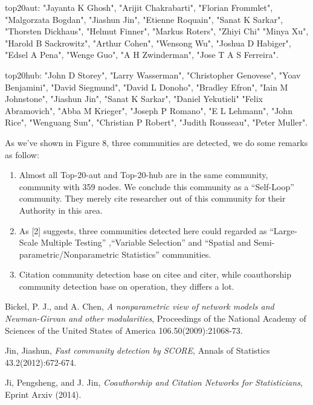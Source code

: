 \documentclass{article}
\numberwithin{equation}{section}
\begin{document}
top20aut: "Jayanta K Ghosh", "Arijit Chakrabarti", "Florian Frommlet", "Malgorzata Bogdan", "Jiashun Jin", "Etienne Roquain", "Sanat K Sarkar", "Thorsten Dickhaus", "Helmut Finner", "Markus Roters", "Zhiyi Chi"
"Minya Xu", "Harold B Sackrowitz", "Arthur Cohen", "Wensong Wu", "Joshua D Habiger", "Edsel A Pena", "Wenge Guo", "A H Zwinderman", "Jose T A S Ferreira".

top20hub: "John D Storey", "Larry Wasserman", "Christopher Genovese", "Yoav Benjamini", "David Siegmund", "David L Donoho", "Bradley Efron", "Iain M Johnstone", "Jiashun Jin", "Sanat K Sarkar", "Daniel Yekutieli"
"Felix Abramovich", "Abba M Krieger", "Joseph P Romano", "E L Lehmann", "John Rice", "Wenguang Sun", "Christian P Robert", "Judith Rousseau", "Peter Muller".

As we’ve shown in Figure 8, three communities are detected, we do some remarks as follow:
\begin{enumerate}
\item Almost all Top-20-aut and Top-20-hub are in the same community, community with 359 nodes. We conclude this community as a “Self-Loop” community. They merely cite researcher out of this community for their Authority in this area.
\item As [2] suggests, three communities detected here could regarded as “Large-Scale Multiple Testing” ,“Variable Selection” and “Spatial and Semi-parametric/Nonparametric Statistics” communities.
\item Citation community detection base on citee and citer, while coauthorship community detection base on operation, they differs a lot.
\end{enumerate}


%
\begin{thebibliography}{99}

 {\sc Bickel, P. J., and A. Chen}, {\em A nonparametric view of network models and Newman-Girvan and other modularities}, Proceedings of the National Academy of Sciences of the United States of America 106.50(2009):21068-73.

{\sc Jin, Jiashun}, {\em Fast community detection by SCORE}, Annals of Statistics 43.2(2012):672-674.

{ \sc Ji, Pengsheng, and J. Jin}, {\em Coauthorship and Citation Networks for Statisticians}, Eprint Arxiv (2014).

\end{thebibliography}
\end{document}
